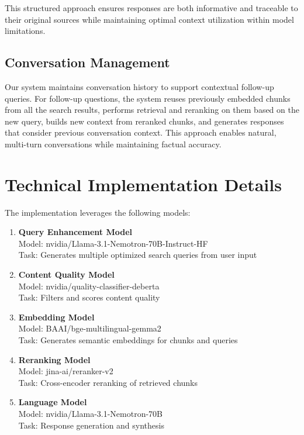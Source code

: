 \documentclass[fleqn,moreauthors,10pt]{ds_report}
\begin{document}
This structured approach ensures responses are both informative and traceable to their original sources while maintaining optimal context utilization within model limitations.

\subsection*{Conversation Management}
Our system maintains conversation history to support contextual follow-up queries. For follow-up questions, the system reuses previously embedded chunks from all the search results, performs retrieval and reranking on them based on the new query, builds new context from reranked chunks, and generates responses that consider previous conversation context. This approach enables natural, multi-turn conversations while maintaining factual accuracy.

\section*{Technical Implementation Details}
The implementation leverages the following models:

\begin{enumerate}[noitemsep]
    \item \textbf{Query Enhancement Model}\\
    Model: nvidia/Llama-3.1-Nemotron-70B-Instruct-HF\\
    Task: Generates multiple optimized search queries from user input
    
    \item \textbf{Content Quality Model}\\
    Model: nvidia/quality-classifier-deberta\\
    Task: Filters and scores content quality
    
    \item \textbf{Embedding Model}\\
    Model: BAAI/bge-multilingual-gemma2\\
    Task: Generates semantic embeddings for chunks and queries
    
    \item \textbf{Reranking Model}\\
    Model: jina-ai/reranker-v2\\
    Task: Cross-encoder reranking of retrieved chunks
    
    \item \textbf{Language Model}\\
    Model: nvidia/Llama-3.1-Nemotron-70B\\
    Task: Response generation and synthesis
\end{enumerate}
\end{document}
